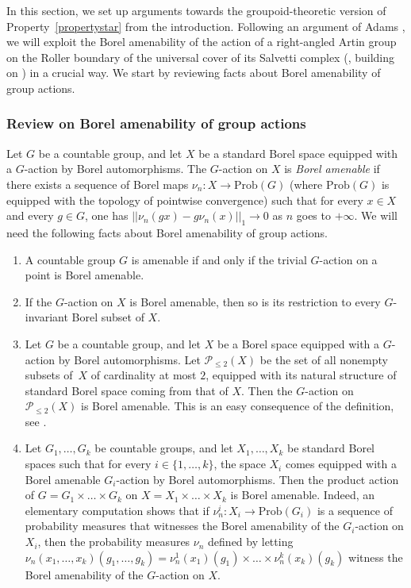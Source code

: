 \documentclass[JEP,XML,SOM,Unicode,NoFloatCountersInSection,published]{cedram}
\let\mathcal\mathscr
\theoremstyle{plain}
\theoremstyle{definition}
\newcommand{\calp}{\mathcal{P}}
\newcommand{\Prob}{\mathrm{Prob}}
\begin{document}
In this section, we set up arguments towards the groupoid-theoretic version of Property~\eqref{propertystar} from the introduction. Following an argument of Adams \cite{Ada}, we will exploit the Borel amenability of the action of a right-angled Artin group on the Roller boundary of the universal cover of its Salvetti complex (\cite[Th.\,5.11]{Duc}, building on \cite{BCGNW}) in a crucial way. We start by reviewing facts about Borel amenability of group actions.\enlargethispage{\baselineskip}%

\subsubsection{Review on Borel amenability of group actions}\label{subsubsec:review}

Let $G$ be a countable group, and let $X$ be a standard Borel space equipped with a $G$-action by Borel automorphisms. The $G$-action on $X$ is \emph{Borel amenable} if there exists a sequence of Borel maps $\nu_n:X\to\Prob(G)$ (where $\Prob(G)$ is equipped with the topology of pointwise convergence) such that for every $x\in X$ and every $g\in G$, one has $||\nu_n(gx)-g\nu_n(x)||_1\to 0$ as $n$ goes to $+\infty$. We will need the following facts about Borel amenability of group actions.
\begin{enumerate}
\item A countable group $G$ is amenable if and only if the trivial $G$-action on a point is Borel amenable.
\item If the $G$-action on $X$ is Borel amenable, then so is its restriction to every $G$-invariant Borel subset of $X$.
\item Let $G$ be a countable group, and let $X$ be a Borel space equipped with a $G$\nobreakdash-action by Borel automorphisms. Let $\calp_{\le 2}(X)$ be the set of all nonempty subsets of~$X$ of cardinality at most $2$, equipped with its natural structure of standard Borel space coming from that of $X$. Then the $G$-action on $\calp_{\le 2}(X)$ is Borel amenable. This is an easy consequence of the definition, see \eg \cite[Lem.\,6.14]{HH}.
\item Let $G_1,\dots,G_k$ be countable groups, and let $X_1,\dots,X_k$ be standard Borel spaces such that for every $i\in\{1,\dots,k\}$, the space $X_i$ comes equipped with a Borel amenable $G_i$-action by Borel automorphisms. Then the product action of $G=G_1\times\dots\times G_k$ on $X=X_1\times\dots\times X_k$ is Borel amenable. Indeed, an elementary computation shows that if $\nu_n^i:X_i\to\Prob(G_i)$ is a sequence of probability measures that witnesses the Borel amenability of the $G_i$-action on $X_i$, then the probability measures $\nu_n$ defined by letting $\nu_n(x_1,\dots,x_k)(g_1,\dots,g_k)=\nu_n^1(x_1)(g_1)\times\dots\times\nu_n^k(x_k)(g_k)$ witness the Borel amenability of the $G$-action on $X$.
\end{enumerate}
\end{document}
